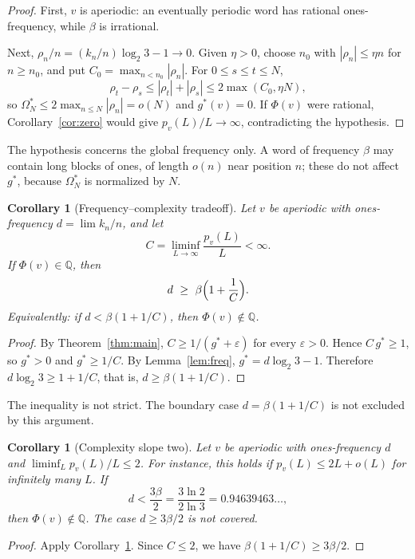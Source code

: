 \documentclass[11pt]{amsart}
\newtheorem{corollary}[theorem]{Corollary}
\theoremstyle{definition}
\theoremstyle{remark}
\newcommand{\Q}{\mathbb{Q}}
\newcommand{\gs}{g^{*}}
\newcommand{\Om}{\Omega^{*}}
\begin{document}
\begin{proof}
First, $v$ is aperiodic: an eventually periodic word has rational ones-frequency, while $\beta$ is irrational.

Next, $\rho_n/n=(k_n/n)\log_2 3-1\to0$. Given $\eta>0$, choose $n_0$ with $|\rho_n|\le\eta n$ for $n\ge n_0$, and put $C_0=\max_{n<n_0}|\rho_n|$. For $0\le s\le t\le N$,
\[
\rho_t-\rho_s\le|\rho_t|+|\rho_s|\le 2\max(C_0,\eta N),
\]
so $\Om_N\le 2\max_{n\le N}|\rho_n|=o(N)$ and $\gs(v)=0$. If $\Phi(v)$ were rational, Corollary~\ref{cor:zero} would give $p_v(L)/L\to\infty$, contradicting the hypothesis.
\end{proof}

The hypothesis concerns the global frequency only. A word of frequency $\beta$ may contain long blocks of ones, of length $o(n)$ near position $n$; these do not affect $\gs$, because $\Om_N$ is normalized by $N$.

\begin{corollary}[Frequency--complexity tradeoff]\label{cor:tradeoff}
Let $v$ be aperiodic with ones-frequency $d=\lim k_n/n$, and let
\[
C=\liminf_{L\to\infty}\frac{p_v(L)}{L}<\infty .
\]
If $\Phi(v)\in\Q$, then
\[
d\ \ge\ \beta\Bigl(1+\frac1C\Bigr).
\]
Equivalently: if $d<\beta(1+1/C)$, then $\Phi(v)\notin\Q$.
\end{corollary}

\begin{proof}
By Theorem~\ref{thm:main}, $C\ge 1/(\gs+\varepsilon)$ for every $\varepsilon>0$. Hence $C\,\gs\ge1$, so $\gs>0$ and $\gs\ge1/C$. By Lemma~\ref{lem:freq}, $\gs=d\log_2 3-1$. Therefore $d\log_2 3\ge 1+1/C$, that is, $d\ge\beta(1+1/C)$.
\end{proof}

The inequality is not strict. The boundary case $d=\beta(1+1/C)$ is not excluded by this argument.

\begin{corollary}[Complexity slope two]\label{cor:two}
Let $v$ be aperiodic with ones-frequency $d$ and $\liminf_{L}p_v(L)/L\le 2$. For instance, this holds if $p_v(L)\le 2L+o(L)$ for infinitely many $L$. If
\[
d<\frac{3\beta}{2}=\frac{3\ln2}{2\ln3}=0.94639463\ldots,
\]
then $\Phi(v)\notin\Q$. The case $d\ge 3\beta/2$ is not covered.
\end{corollary}

\begin{proof}
Apply Corollary~\ref{cor:tradeoff}. Since $C\le2$, we have $\beta(1+1/C)\ge 3\beta/2$.
\end{proof}
\end{document}
